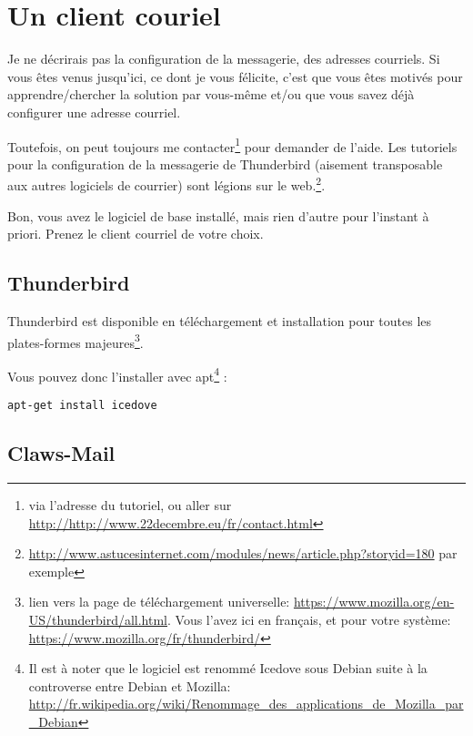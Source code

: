 \section{Un client couriel}\label{un-client-couriel}

\begin{notice}
Je ne décrirais pas la configuration de la messagerie, des adresses
courriels. Si vous êtes venus jusqu'ici, ce dont je vous félicite,
c'est que vous êtes motivés pour apprendre/chercher la solution par
vous-même et/ou que vous savez déjà configurer une adresse courriel.

Toutefois, on peut toujours me contacter\footnote{via l'adresse du tutoriel, ou aller sur \url{http://http://www.22decembre.eu/fr/contact.html}} pour demander de l'aide. Les tutoriels pour la configuration de la messagerie de Thunderbird (aisement transposable aux autres logiciels de courrier) sont légions sur le web.\footnote{\url{http://www.astucesinternet.com/modules/news/article.php?storyid=180} par exemple}.
\end{notice}

Bon, vous avez le logiciel de base installé, mais rien d'autre pour
l'instant à priori. Prenez le client courriel de votre choix.

\subsection{Thunderbird}\label{thunderbird}

Thunderbird est disponible en téléchargement et installation pour toutes
les plates-formes majeures\footnote{lien vers la page de téléchargement universelle: \url{https://www.mozilla.org/en-US/thunderbird/all.html}.
	Vous l'avez ici en français, et pour votre système: \url{https://www.mozilla.org/fr/thunderbird/}}.

Vous pouvez donc l'installer avec apt\footnote{Il est à noter que le logiciel est renommé Icedove sous Debian suite à la
	controverse entre Debian et Mozilla: \url{http://fr.wikipedia.org/wiki/Renommage_des_applications_de_Mozilla_par_Debian}} :

\begin{lstlisting}
apt-get install icedove
\end{lstlisting}

\subsection{Claws-Mail}\label{claws-mail}

